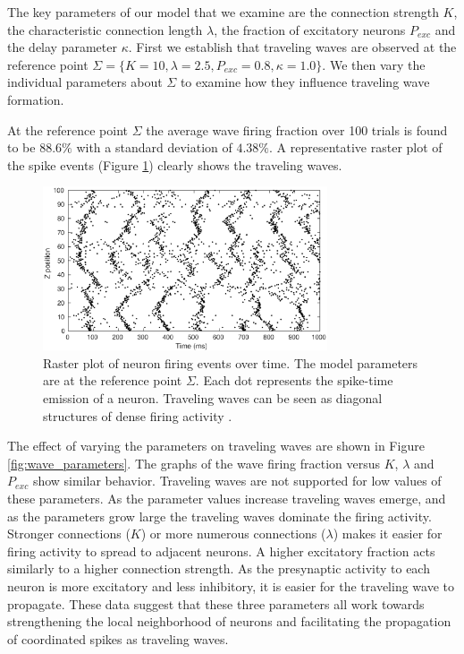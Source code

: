 \documentclass[12pt]{article}
\begin{document}
The key parameters of our model that we examine are the connection strength $K$, the characteristic connection length $\lambda$, the fraction of excitatory neurons $P_{exc}$ and the delay parameter $\kappa$.
First we establish that traveling waves are observed at the reference  point $\Sigma = \{K=10,\lambda=2.5,P_{exc}=0.8,\kappa=1.0 \}$.
We then vary the individual parameters about $\Sigma$ to examine how they influence traveling wave formation.

At the reference  point $\Sigma$ the average wave firing fraction over 100 trials is found to be $88.6\%$ with a standard deviation of $4.38\%$.
A representative raster plot of the spike events (Figure \ref{fig:sigma_raster}) clearly shows the traveling waves.
\begin{figure}[!htb]
 \centering
 \includegraphics[width=0.75\textwidth]{fig/baseline}
 \caption{Raster plot of neuron firing events over time. The model parameters are at the reference  point $\Sigma$. Each dot represents the spike-time emission of a neuron. Traveling waves can be seen as diagonal structures of dense firing activity \parencite{Senk2020}. }
 \label{fig:sigma_raster}
\end{figure}

The effect of varying the parameters on traveling waves are shown in Figure \ref{fig:wave_parameters}.
The graphs of the wave firing fraction versus $K$, $\lambda$ and $P_{exc}$ show similar behavior.
Traveling waves are not supported for low values of these parameters.
As the parameter values increase traveling waves emerge, and as the parameters grow large the traveling waves dominate the firing activity.
Stronger connections ($K$) or more numerous connections ($\lambda$) makes it easier for firing activity to spread to adjacent neurons.
A higher excitatory fraction acts similarly to a higher connection strength. 
As the presynaptic activity to each neuron is more excitatory and less inhibitory, it is easier for the traveling wave to propagate.
These data suggest that these three parameters all work towards strengthening the local neighborhood of neurons and facilitating the propagation of coordinated spikes as traveling waves.
\end{document}
